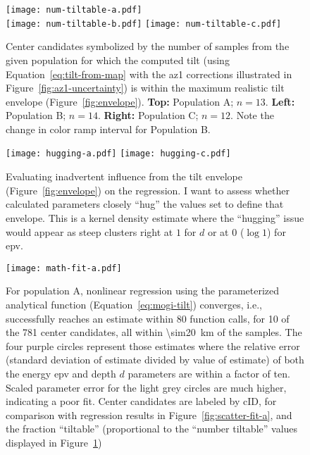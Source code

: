 \begin{figure}
    \begin{center}
     \texttt{[image: num-tiltable-a.pdf]}\\
     \texttt{[image: num-tiltable-b.pdf]}%
     \texttt{[image: num-tiltable-c.pdf]}
     \caption[Inflation center candidates by number of ``tiltable'' samples]{Center candidates symbolized by the number of samples from the given population for which the computed tilt (using Equation~\eqref{eq:tilt-from-map} with the \acs{az1} corrections illustrated in Figure~\ref{fig:az1-uncertainty}) is within the maximum realistic tilt envelope (Figure~\ref{fig:envelope}). \textbf{Top:} Population A; $n=13$. \textbf{Left:} Population B; $n=14$. \textbf{Right:} Population C; $n=12$. Note the change in color ramp interval for Population B.} 
     \label{fig:num-tiltable}
    \end{center}
\end{figure}

\begin{figure}
    \texttt{[image: hugging-a.pdf]}
    \texttt{[image: hugging-c.pdf]}
    \caption[Check for envelope ``hugging'']{Evaluating inadvertent influence from the tilt envelope (Figure~\ref{fig:envelope}) on the regression. I want to assess whether calculated parameters closely ``hug'' the values set to define that envelope. This is a kernel density estimate where the ``hugging'' issue would appear as steep clusters right at $1$ for $d$ or at $0$ ($\log1$) for \acs{epv}.} 
    \label{fig:hugging}
\end{figure}

\begin{figure}
    \texttt{[image: math-fit-a.pdf]}%
    \caption[Population A: goodness of fit]{For population A, nonlinear regression using the parameterized analytical function (Equation~\eqref{eq:mogi-tilt}) converges, i.e., successfully reaches an estimate within 80 function calls, for 10 of the 781 center candidates, all within \qty{\sim20}{\km} of the samples. The four purple circles represent those estimates where the relative error (standard deviation of estimate divided by value of estimate) of both the energy \acs{epv} and depth $d$ parameters are within a factor of ten. Scaled parameter error for the light grey circles are much higher, indicating a poor fit. Center candidates are labeled by cID, for comparison with regression results in Figure~\ref{fig:scatter-fit-a}, and the fraction ``tiltable'' (proportional to the ``number tiltable'' values displayed in Figure~\ref{fig:num-tiltable})}%
    \label{fig:math-fit-a}
\end{figure}

